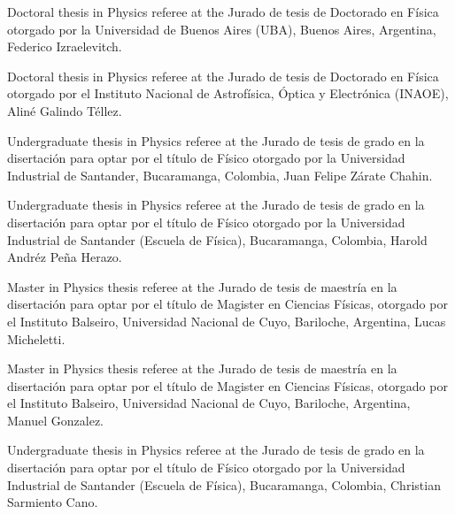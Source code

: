 \ifeng
Doctoral thesis in Physics referee at the 
\else
Jurado de tesis de Doctorado en Física otorgado por la 
\fi
Universidad de Buenos Aires (UBA), Buenos Aires, Argentina, Federico Izraelevitch.

\ifeng
Doctoral thesis in Physics referee at the 
\else
Jurado de tesis de Doctorado en Física otorgado por el 
\fi
Instituto Nacional de Astrofísica, Óptica y Electrónica (INAOE), Aliné Galindo Téllez.

\ifeng
Undergraduate thesis in Physics referee at the  
\else
Jurado de tesis de grado en la disertación para optar por el título de Físico otorgado por la 
\fi
Universidad Industrial de Santander, Bucaramanga, Colombia, Juan Felipe Zárate Chahin.

\ifeng
Undergraduate thesis in Physics referee at the  
\else
Jurado de tesis de grado en la disertación para optar por el título de Físico otorgado por la 
\fi
Universidad Industrial de Santander (Escuela de Física), Bucaramanga, Colombia, Harold Andréz Peña Herazo.

\ifeng
Master in Physics thesis referee at the
\else
Jurado de tesis de maestría en la disertación para optar por el título de Magister en Ciencias Físicas, otorgado por el 
\fi
Instituto Balseiro, Universidad Nacional de Cuyo, Bariloche, Argentina, Lucas Micheletti.

\ifeng
Master in Physics thesis referee at the
\else
Jurado de tesis de maestría en la disertación para optar por el título de Magister en Ciencias Físicas, otorgado por el 
\fi
Instituto Balseiro, Universidad Nacional de Cuyo, Bariloche, Argentina, Manuel Gonzalez.

\ifeng
Undergraduate thesis in Physics referee at the  
\else
Jurado de tesis de grado en la disertación para optar por el título de Físico otorgado por la 
\fi
Universidad Industrial de Santander (Escuela de Física), Bucaramanga, Colombia, Christian Sarmiento Cano.
